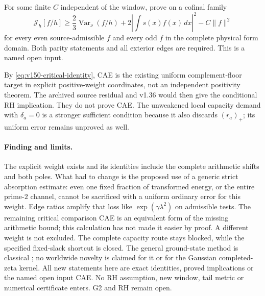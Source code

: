 \begin{assumption}
\label{ass:v150-cae}
For some finite $C$ independent of the window, prove on a cofinal family
\begin{equation}\label{eq:v150-cae}
 \mathcal J_h[f/h]\ge
 \frac23\operatorname{Var}_{\nu}(f/h)
       +2\left|\int s(x)f(x)\,dx\right|^2-C\|f\|^2
\end{equation}
for every even source-admissible $f$ and every odd $f$ in the complete
physical form domain. Both parity statements and all exterior edges
are required. This is a named open input.
\end{assumption}
By \eqref{eq:v150-critical-identity}, CAE is the existing uniform
complement-floor target in explicit positive-weight coordinates, not
an independent positivity theorem. The archived source residual and
v1.36 would then give the conditional RH implication. They do not
prove CAE. The unweakened local capacity demand with $\delta_a=0$
is a stronger sufficient condition because it also discards $(r_a)_+$;
its uniform error remains unproved as well.

\paragraph{Finding and limits.}
The explicit weight exists and its identities include the complete
arithmetic shifts and both poles. What had to change is the proposed
use of a generic strict absorption estimate: even one fixed fraction
of transformed energy, or the entire prime-$2$ channel, cannot be
sacrificed with a uniform ordinary error for this weight. Edge ratios
amplify that loss like $\exp(\gamma\lambda^2)$ on admissible tests.
The remaining critical comparison CAE is an equivalent form of the
missing arithmetic bound; this calculation has not made it easier
by proof. A different weight is not excluded. The complete capacity
route stays blocked, while the specified fixed-slack shortcut is closed.
The general ground-state method is classical
\cite{FrankSeiringer2008}; no worldwide novelty is claimed for it or
for the Gaussian completed-zeta kernel. All new statements here are
exact identities, proved implications or the named open input CAE.
No RH assumption, new window, tail metric or numerical certificate
enters. G2 and RH remain open.

